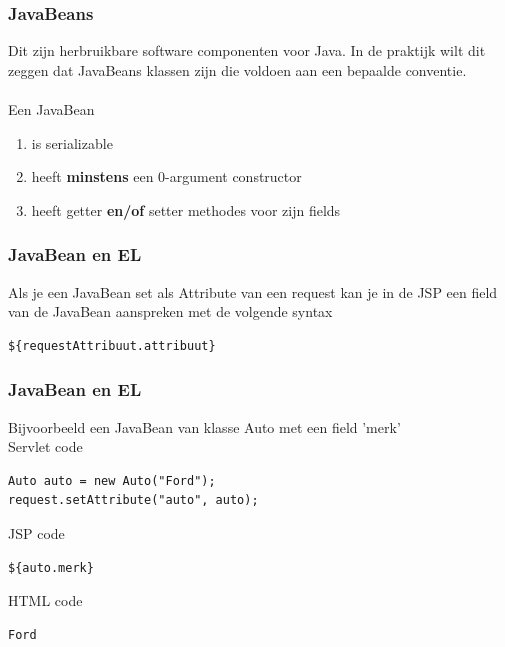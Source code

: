 \documentclass{beamer}
\begin{document}
\begin{frame}

\frametitle{JavaBeans}

{\Large Dit zijn herbruikbare software componenten voor Java. In de praktijk wilt dit zeggen dat JavaBeans klassen zijn die voldoen aan een bepaalde conventie.\\~\\
Een JavaBean\\

\begin{enumerate}
  \item is serializable\\
  \item heeft \textbf{minstens} een 0-argument constructor\\
  \item heeft getter \textbf{en/of} setter methodes voor zijn fields
\end{enumerate}
}
\end{frame}


\begin{frame}[fragile]

\frametitle{JavaBean en EL}

{\Large Als je een JavaBean set als Attribute van een request kan je in
de JSP een field van de JavaBean aanspreken met de volgende syntax

\begin{verbatim}
${requestAttribuut.attribuut}
\end{verbatim}
}

\end{frame}


\begin{frame}[fragile]

\frametitle{JavaBean en EL}

{\Large Bijvoorbeeld een JavaBean van klasse Auto met een field 'merk'\\
Servlet code
\begin{verbatim}
Auto auto = new Auto("Ford");
request.setAttribute("auto", auto);
\end{verbatim}

JSP code
\begin{verbatim}
${auto.merk}
\end{verbatim}

HTML code
\begin{verbatim}
Ford
\end{verbatim}
}

\end{frame}
\end{document}

